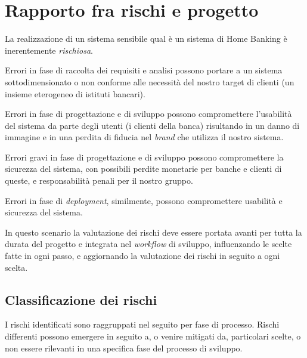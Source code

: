 \documentclass[10pt]{softeng} %
\begin{document}
\flushbottom %

\maketitle %

\tableofcontents %

\thispagestyle{empty} %

\section{Rapporto fra rischi e progetto}

La realizzazione di un sistema sensibile qual \`e un sistema di Home Banking \`e inerentemente \emph{rischiosa}.

Errori in fase di raccolta dei requisiti e analisi possono portare a un sistema sottodimensionato o non conforme alle necessit\`a del nostro target di clienti (un insieme eterogeneo di istituti bancari).

Errori in fase di progettazione e di sviluppo possono compromettere l'usabilit\`a del sistema da parte degli utenti (i clienti della banca) risultando in un danno di immagine e in una perdita di fiducia nel \emph{brand} che utilizza il nostro sistema.

Errori gravi in fase di progettazione e di sviluppo possono compromettere la sicurezza del sistema, con possibili perdite monetarie per banche e clienti di queste, e responsabilit\`a penali per il nostro gruppo.

Errori in fase di \emph{deployment}, similmente, possono compromettere usabilit\`a e sicurezza del sistema.

In questo scenario la valutazione dei rischi deve essere portata avanti per tutta la durata del progetto e integrata nel \emph{workflow} di sviluppo, influenzando le scelte fatte in ogni passo, e aggiornando la valutazione dei rischi in seguito a ogni scelta.

\subsection{Classificazione dei rischi}

I rischi identificati sono raggruppati nel seguito per fase di processo.
Rischi differenti possono emergere in seguito a, o venire mitigati da, particolari scelte, o non essere rilevanti in una specifica fase del processo di sviluppo.
\end{document}
